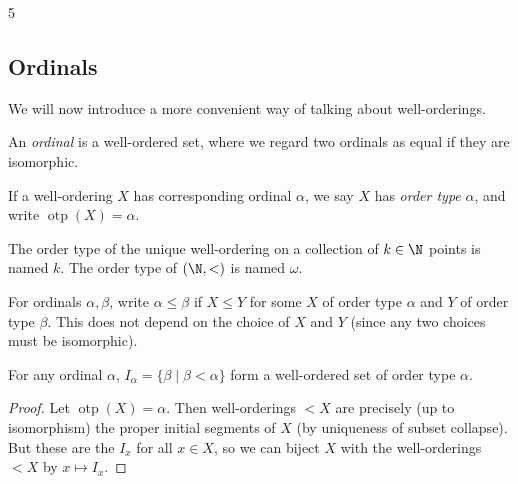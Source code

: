 \documentclass[a3paper, 10pt]{article}
\renewcommand{\vocab}[1]{\emph{#1}}
\begin{document}
\begin{multicols*}{5}
\subsection{Ordinals}

We will now introduce a more convenient way of talking about well-orderings.

\begin{definition}[Ordinal]
  An \vocab{ordinal} is a well-ordered set, where we regard two ordinals as equal if they are isomorphic.
\end{definition}

\begin{definition}
If a well-ordering $X$ has corresponding ordinal $\alpha$, we say $X$ has \vocab{order type} $\alpha$, and write $\operatorname{otp}(X) = \alpha$.
\end{definition}
  
The order type of the unique well-ordering on a collection of $k \in \N$ points is named $k$. The order type of $(\N, <)$ is named $\omega$. 


For ordinals $\alpha, \beta$, write $\alpha \leq \beta$ if $X \leq Y$ for some $X$ of order type $\alpha$ and $Y$ of order type $\beta$. This does not depend on the choice of $X$ and $Y$ (since any two choices must be isomorphic).


\begin{proposition}
  For any ordinal $\alpha$, $I_\alpha = \{\beta \mid \beta < \alpha\}$ form a well-ordered set of order type $\alpha$. 
\end{proposition}
\begin{proof}
  Let $\operatorname{otp}(X) = \alpha$. 
  Then well-orderings $<X$ are precisely (up to isomorphism) the proper initial segments of $X$ (by uniqueness of subset collapse). But these are the $I_x$ for all $x \in X$, so we can biject $X$ with the well-orderings $<X$ by $x \mapsto I_x$.
\end{proof}


\end{multicols*}
\end{document}
